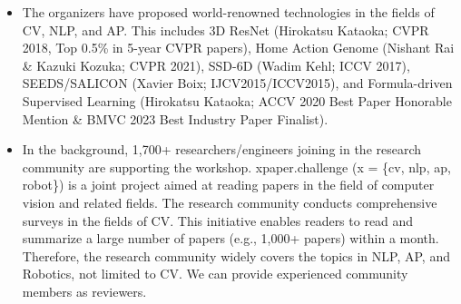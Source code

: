 \documentclass{article}
\begin{document}
\begin{itemize}

    \item The organizers have proposed world-renowned technologies in the fields of CV, NLP, and AP. This includes 3D ResNet (Hirokatsu Kataoka; CVPR 2018, Top 0.5\% in 5-year CVPR papers), Home Action Genome (Nishant Rai \& Kazuki Kozuka; CVPR 2021), SSD-6D (Wadim Kehl; ICCV 2017), SEEDS/SALICON (Xavier Boix; IJCV2015/ICCV2015), and Formula-driven Supervised Learning (Hirokatsu Kataoka; ACCV 2020 Best Paper Honorable Mention \& BMVC 2023 Best Industry Paper Finalist). %

    \item In the background, 1,700+ researchers/engineers joining in the research community are supporting the workshop. xpaper.challenge (x = \{cv, nlp, ap, robot\}) is a joint project aimed at reading papers in the field of computer vision and related fields. The research community conducts comprehensive surveys in the fields of CV. This initiative enables readers to read and summarize a large number of papers (e.g., 1,000+ papers) within a month. Therefore, the research community widely covers the topics in NLP, AP, and Robotics, not limited to CV. We can provide experienced community members as reviewers.


\end{itemize}
\end{document}
